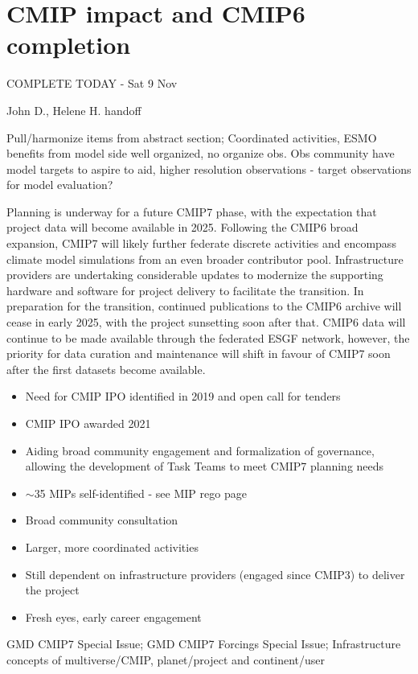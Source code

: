 \documentclass[gmd, preprint]{copernicus}
\def\cred#1{{\color{red}#1}}
\def\cblue#1{{\color{blue}#1}}
\begin{document}
\section{CMIP impact and CMIP6 completion}
\label{sec:CMIP6Completion}
\cblue{COMPLETE TODAY - Sat 9 Nov}

\cred{John D., Helene H. handoff}

\cred{Pull/harmonize items from abstract section; Coordinated activities, ESMO benefits from model side well organized, no organize obs. Obs community have model targets to aspire to aid, higher resolution observations - target observations for model evaluation?}

Planning is underway for a future CMIP7 phase, with the expectation that project data will become available in 2025. Following the CMIP6 broad expansion, CMIP7 will likely further federate discrete activities and encompass climate model simulations from an even broader contributor pool. Infrastructure providers are undertaking considerable updates to modernize the supporting hardware and software for project delivery to facilitate the transition. In preparation for the transition, continued publications to the CMIP6 archive will cease in early 2025, with the project sunsetting soon after that. CMIP6 data will continue to be made available through the federated ESGF network, however, the priority for data curation and maintenance will shift in favour of CMIP7 soon after the first datasets become available.

\cred{
\begin{itemize}
	\item Need for CMIP IPO identified in 2019 and open call for tenders
	\item CMIP IPO awarded 2021
	\item Aiding broad community engagement and formalization of governance, allowing the development of Task Teams to meet CMIP7 planning needs
	\item $\sim$35 MIPs self-identified - see MIP rego page
	\item Broad community consultation
	\item Larger, more coordinated activities
	\item Still dependent on infrastructure providers (engaged since CMIP3) to deliver the project
    \item Fresh eyes, early career engagement
\end{itemize}
}

\cred{GMD CMIP7 Special Issue; GMD CMIP7 Forcings Special Issue; Infrastructure concepts of multiverse/CMIP, planet/project and continent/user}
\end{document}
